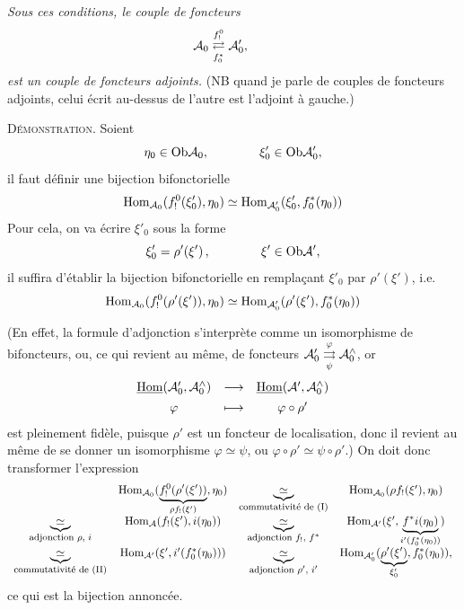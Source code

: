 \textit{Sous ces conditions, le couple de foncteurs}
\[
\cA_0 \adj{f_!^0}{f_0^*} \cA'_0, \qquad
\]
\textit{est un couple de foncteurs adjoints.} (NB quand je parle de couples de foncteurs adjoints, celui écrit au-dessus de l'autre est l'adjoint à gauche.)

\textsc{Démonstration}. Soient
\[
\eta_0 \in \Ob \cA_0, \qquad\qquad \xi'_0 \in \Ob \cA'_0,
\]
il faut définir une bijection bifonctorielle
\[
\Hom_{\cA_0}(f_!^0(\xi'_0), \eta_0) \simeq \Hom_{\cA'_0}(\xi'_0, f_0^*(\eta_0))
\]
Pour cela, on va écrire $\xi'_0$ sous la forme
\[
\xi'_0 = \rho'(\xi')\,, \qquad\qquad \xi' \in \Ob \cA',
\]
il suffira d'établir la bijection bifonctorielle en remplaçant $\xi'_0$ par $\rho'(\xi')$, i.e.
\[
\Hom_{\cA_0}(f_!^0(\rho'(\xi')), \eta_0) \simeq \Hom_{\cA'_0}(\rho'(\xi'), f_0^*(\eta_0))
\]



(En effet, la formule d'adjonction s'interprète comme un isomorphisme de bifoncteurs, ou, ce qui revient au même, de foncteurs $\cA'_0 \mathrel{\underset{\psi}{\overset{\varphi}{\rightrightarrows}}} \cA_0^{\wedge}$, or
\[
\begin{array}{ccc}
\uHom(\cA'_0, \cA_0^{\wedge}) & \longrightarrow & \uHom(\cA', \cA_0^{\wedge}) \\[1ex]
\varphi & \longmapsto & \varphi \circ \rho'
\end{array}
\]
est pleinement fidèle, puisque $\rho'$ est un foncteur de localisation, donc il revient au même de se donner un isomorphisme $\varphi \simeq \psi$, ou $\varphi \circ \rho' \simeq \psi \circ \rho'$.) On doit donc transformer l'expression
\[
\begin{array}{cccc}
 & \Hom_{\cA_0}(\underbrace{f_!^0(\rho'(\xi'))}_{\rho f_!(\xi')}, \eta_0) & \underbrace{\simeq}_{\text{\footnotesize commutativité de (I)}} & \Hom_{\cA_0}(\rho f_!(\xi'), \eta_0) \\[3ex]
\underbrace{\simeq}_{\text{\footnotesize adjonction $\rho$, $i$}} & \Hom_{\cA}(f_!(\xi'), i(\eta_0)) & \underbrace{\simeq}_{\text{\footnotesize adjonction $f_!$, $f^*$}} & \Hom_{\cA'}(\xi', \underbrace{f^*i(\eta_0)}_{i'(f_0^*(\eta_0))}) \\[3ex]
\underbrace{\simeq}_{\text{\footnotesize commutativité de (II)}} & \Hom_{\cA'}(\xi', i'(f_0^*(\eta_0))) & \underbrace{\simeq}_{\text{\footnotesize adjonction $\rho'$, $i'$}} & \Hom_{\cA'_0}(\underbrace{\rho'(\xi')}_{\xi'_0}, f_0^*(\eta_0)),
\end{array}
\]
ce qui est la bijection annoncée.

